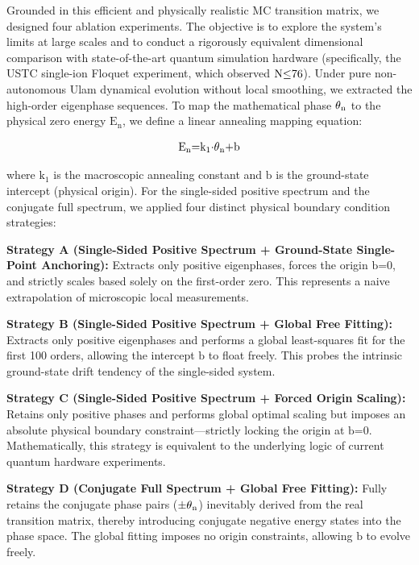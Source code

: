 \documentclass[fleqn,10pt]{wlscirep}
\begin{document}
Grounded in this efficient and physically realistic MC transition
matrix, we designed four ablation experiments. The objective is to
explore the system's limits at large scales and to conduct a rigorously
equivalent dimensional comparison with state-of-the-art quantum
simulation hardware (specifically, the USTC single-ion Floquet
experiment, which observed \(\text{N}\text{\ensuremath{\le}76}\)). Under pure
non-autonomous Ulam dynamical evolution without local smoothing, we
extracted the high-order eigenphase sequences. To map the mathematical
phase \(\text{\ensuremath{\theta}}_{\text{n}}\) to the physical zero energy
\(\text{E}_{\text{n}}\), we define a linear annealing mapping equation:

\[\text{E}_{\text{n}}\text{=}\text{k}_{\text{1}}\text{\ensuremath{\cdot}}\text{\ensuremath{\theta}}_{\text{n}}\text{+}\text{b}\]

where \(\text{k}_{\text{1}}\) is the macroscopic annealing constant and
\(\text{b}\) is the ground-state intercept (physical origin). For the
single-sided positive spectrum and the conjugate full spectrum, we
applied four distinct physical boundary condition strategies:

\textbf{Strategy A (Single-Sided Positive Spectrum + Ground-State
Single-Point Anchoring):} Extracts only positive eigenphases, forces the
origin \(\text{b}\text{=0}\), and strictly scales based solely on the
first-order zero. This represents a naive extrapolation of microscopic
local measurements.

\textbf{Strategy B (Single-Sided Positive Spectrum + Global Free
Fitting):} Extracts only positive eigenphases and performs a global
least-squares fit for the first 100 orders, allowing the intercept
\(\text{b}\) to float freely. This probes the intrinsic ground-state
drift tendency of the single-sided system.

\textbf{Strategy C (Single-Sided Positive Spectrum + Forced Origin
Scaling):} Retains only positive phases and performs global optimal
scaling but imposes an absolute physical boundary constraint---strictly
locking the origin at \(\text{b}\text{=0}\). Mathematically, this
strategy is equivalent to the underlying logic of current quantum
hardware experiments.

\textbf{Strategy D (Conjugate Full Spectrum + Global Free Fitting):}
Fully retains the conjugate phase pairs
(\(\text{\ensuremath{\pm}}\text{\ensuremath{\theta}}_{\text{n}}\)) inevitably derived from the real
transition matrix, thereby introducing conjugate negative energy states
into the phase space. The global fitting imposes no origin constraints,
allowing \(\text{b}\) to evolve freely.
\end{document}

